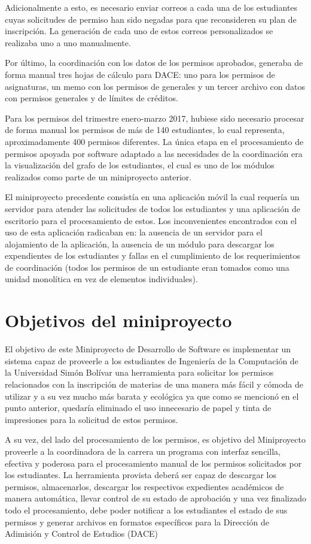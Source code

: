 \documentclass[]{article}
\begin{document}
Adicionalmente a esto, es necesario enviar correos a cada una de los
estudiantes cuyas solicitudes de permiso han sido negadas para que
reconsideren su plan de inscripción. La generación de cada uno de estos
correos personalizados se realizaba uno a uno manualmente.

Por último, la coordinación con los datos de los permisos aprobados,
generaba de forma manual tres hojas de cálculo para DACE: uno para los
permisos de asignaturas, un memo con los permisos de generales y un
tercer archivo con datos con permisos generales y de límites de
créditos.

Para los permisos del trimestre enero-marzo 2017, hubiese sido necesario
procesar de forma manual los permisos de más de 140 estudiantes, lo cual
representa, aproximadamente 400 permisos diferentes. La única etapa en
el procesamiento de permisos apoyada por software adaptado a las
necesidades de la coordinación era la visualización del grafo de los
estudiantes, el cual es uno de los módulos realizados como parte de un
miniproyecto anterior.

El miniproyecto precedente consistía en una aplicación móvil la cual
requería un servidor para atender las solicitudes de todos los
estudiantes y una aplicación de escritorio para el procesamiento de
estos. Los inconvenientes encontrados con el uso de esta aplicación
radicaban en: la ausencia de un servidor para el alojamiento de la
aplicación, la ausencia de un módulo para descargar los expendientes de
los estudiantes y fallas en el cumplimiento de los requerimientos de
coordinación (todos los permisos de un estudiante eran tomados como una
unidad monolítica en vez de elementos individuales).

\section{Objetivos del miniproyecto}\label{objetivos-del-miniproyecto}

El objetivo de este Miniproyecto de Desarrollo de Software es
implementar un sistema capaz de proveerle a los estudiantes de
Ingeniería de la Computación de la Universidad Simón Bolívar una
herramienta para solicitar los permisos relacionados con la inscripción
de materias de una manera más fácil y cómoda de utilizar y a su vez
mucho más barata y ecológica ya que como se mencionó en el punto
anterior, quedaría eliminado el uso innecesario de papel y tinta de
impresiones para la solicitud de estos permisos.

A su vez, del lado del procesamiento de los permisos, es objetivo del
Miniproyecto proveerle a la coordinadora de la carrera un programa con
interfaz sencilla, efectiva y poderosa para el procesamiento manual de
los permisos solicitados por los estudiantes. La herramienta provista
deberá ser capaz de descargar los permisos, almacenarlos, descargar los
respectivos expedientes académicos de manera automática, llevar control
de su estado de aprobación y una vez finalizado todo el procesamiento,
debe poder notificar a los estudiantes el estado de sus permisos y
generar archivos en formatos específicos para la Dirección de Adimisión
y Control de Estudios (DACE)
\end{document}
